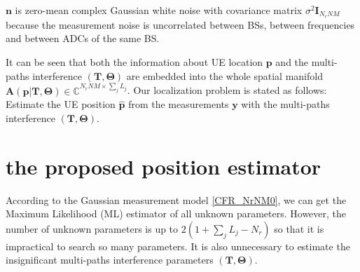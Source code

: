 \documentclass[journal]{IEEEtran}
\def \arg{\operatorname{arg}}
\begin{document}
$\boldsymbol{n}$ is zero-mean complex Gaussian white noise with covariance matrix $\sigma^2\boldsymbol{I}_{N_rNM}$ because the measurement noise is uncorrelated between BSs, between frequencies and between ADCs of the same BS.

It can be seen that both the information about UE location $\boldsymbol{p}$ and the multi-paths interference $(\mathbf{T},\boldsymbol{\Theta})$ are embedded into the whole spatial manifold $\boldsymbol{A}(\boldsymbol{p}\vert \mathbf{T},\boldsymbol{\Theta})\in \mathbb{C}^{N_rNM\times\sum_jL_j}$.
Our localization problem is stated as follows: Estimate the UE position $\hat{\boldsymbol{p}}$ from the measurements $\boldsymbol{y}$ with the multi-paths interference $(\mathbf{T},\boldsymbol{\Theta})$.

\section{the proposed position estimator}
\label{sec:algorithm}
According to the Gaussian measurement model \eqref{CFR_NrNM0}, we can get the Maximum Likelihood (ML) estimator of all unknown parameters.
However, the number of unknown parameters is up to $2(1+\sum_jL_j-N_r)$ so that it is impractical to search so many parameters. It is also unnecessary to estimate the insignificant multi-paths interference parameters $(\mathbf{T},\boldsymbol{\Theta})$.
\end{document}
